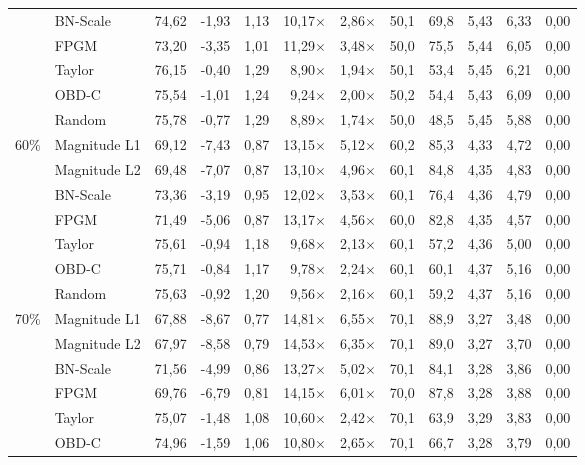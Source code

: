 \begin{table}[H]
{{\begin{tabular}{c l rr rrr rr rrr}
     & BN-Scale & 74,62 & -1,93 & 1,13 & 10,17$\times$ & 2,86$\times$ & 50,1 & 69,8 & 5,43 & 6,33 & 0,00 \\
     & FPGM & 73,20 & -3,35 & 1,01 & 11,29$\times$ & 3,48$\times$ & 50,0 & 75,5 & 5,44 & 6,05 & 0,00 \\
     & Taylor & 76,15 & -0,40 & 1,29 & 8,90$\times$ & 1,94$\times$ & 50,1 & 53,4 & 5,45 & 6,21 & 0,00 \\
     & OBD-C & 75,54 & -1,01 & 1,24 & 9,24$\times$ & 2,00$\times$ & 50,2 & 54,4 & 5,43 & 6,09 & 0,00 \\
     & Random & 75,78 & -0,77 & 1,29 & 8,89$\times$ & 1,74$\times$ & 50,0 & 48,5 & 5,45 & 5,88 & 0,00 \\
    \midrule
    \multirow{7}{*}{60\%} & Magnitude L1 & 69,12 & -7,43 & 0,87 & 13,15$\times$ & 5,12$\times$ & 60,2 & 85,3 & 4,33 & 4,72 & 0,00 \\
     & Magnitude L2 & 69,48 & -7,07 & 0,87 & 13,10$\times$ & 4,96$\times$ & 60,1 & 84,8 & 4,35 & 4,83 & 0,00 \\
     & BN-Scale & 73,36 & -3,19 & 0,95 & 12,02$\times$ & 3,53$\times$ & 60,1 & 76,4 & 4,36 & 4,79 & 0,00 \\
     & FPGM & 71,49 & -5,06 & 0,87 & 13,17$\times$ & 4,56$\times$ & 60,0 & 82,8 & 4,35 & 4,57 & 0,00 \\
     & Taylor & 75,61 & -0,94 & 1,18 & 9,68$\times$ & 2,13$\times$ & 60,1 & 57,2 & 4,36 & 5,00 & 0,00 \\
     & OBD-C & 75,71 & -0,84 & 1,17 & 9,78$\times$ & 2,24$\times$ & 60,1 & 60,1 & 4,37 & 5,16 & 0,00 \\
     & Random & 75,63 & -0,92 & 1,20 & 9,56$\times$ & 2,16$\times$ & 60,1 & 59,2 & 4,37 & 5,16 & 0,00 \\
    \midrule
    \multirow{7}{*}{70\%} & Magnitude L1 & 67,88 & -8,67 & 0,77 & 14,81$\times$ & 6,55$\times$ & 70,1 & 88,9 & 3,27 & 3,48 & 0,00 \\
     & Magnitude L2 & 67,97 & -8,58 & 0,79 & 14,53$\times$ & 6,35$\times$ & 70,1 & 89,0 & 3,27 & 3,70 & 0,00 \\
     & BN-Scale & 71,56 & -4,99 & 0,86 & 13,27$\times$ & 5,02$\times$ & 70,1 & 84,1 & 3,28 & 3,86 & 0,00 \\
     & FPGM & 69,76 & -6,79 & 0,81 & 14,15$\times$ & 6,01$\times$ & 70,0 & 87,8 & 3,28 & 3,88 & 0,00 \\
     & Taylor & 75,07 & -1,48 & 1,08 & 10,60$\times$ & 2,42$\times$ & 70,1 & 63,9 & 3,29 & 3,83 & 0,00 \\
     & OBD-C & 74,96 & -1,59 & 1,06 & 10,80$\times$ & 2,65$\times$ & 70,1 & 66,7 & 3,28 & 3,79 & 0,00 \\

\end{tabular}}}
\end{table}
